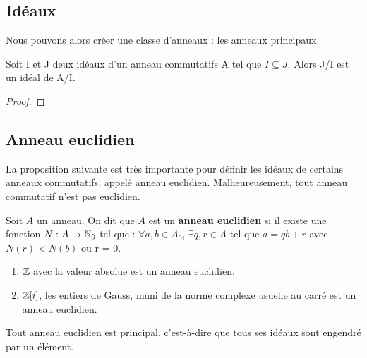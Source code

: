 


\subsection{Idéaux}

Nous pouvons alors créer une classe d'anneaux : les anneaux principaux.


\begin{exemple}

\end{exemple}

\begin{proposition}
	Soit I et J deux idéaux d'un anneau commutatifs A tel que $I \subseteq J$.
	Alors J/I est un idéal de A/I.
\end{proposition}

\ifdefined\outputproof
\begin{proof}

\end{proof}
\fi

\subsection{Anneau euclidien}

La proposition suivante est très importante pour définir les idéaux de certains
anneaux commutatifs, appelé anneau euclidien. Malheureusement, tout anneau
commutatif n'est pas euclidien.

\begin{definition} 
	Soit $A$ un anneau. On dit que $A$ est un \textbf{anneau euclidien} si il existe
	une fonction $N : A \rightarrow \mathbb{N}_{0}$ tel que : $\forall a, b \in
	A_{0}$, $\exists q, r \in A$ tel que $a = qb + r$ avec $N(r) < N(b)$ ou r =
	0.
	\label{euclidian_ring}
\end{definition}

\begin{exemple}
	\begin{enumerate}
		\item $\mathbb{Z}$ avec la valeur absolue est un anneau euclidien.
		\item $\mathbb{Z}[i]$, les entiers de Gauss, muni de la norme complexe
			usuelle au carré est un anneau euclidien.
	\end{enumerate}
\end{exemple}

\begin{proposition}
	Tout anneau euclidien est principal, c'est-à-dire que tous ses idéaux sont
	engendré par un élément.
	\label{euclidian_implies_principal}
\end{proposition}

